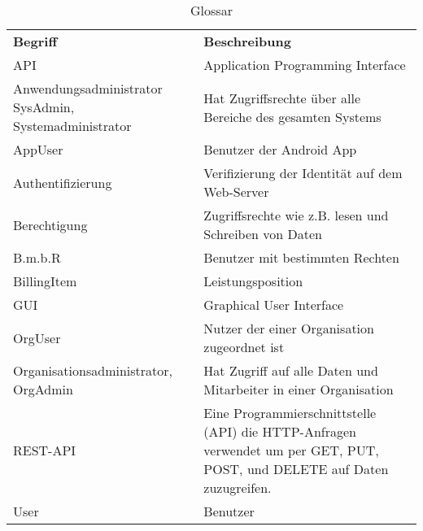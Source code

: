 
\begin{table}[h]
	\centering
	\begin{tabularx}{\textwidth}{X X}
		\rowcolor[HTML]{C0C0C0} 
		\textbf{Begriff} & \textbf{Beschreibung} \\
		API & Application Programming Interface\\

		\rowcolor[HTML]{E7E7E7} 
		Anwendungsadministrator SysAdmin, Systemadministrator  & Hat Zugriffsrechte über alle Bereiche des gesamten Systems \\
		AppUser & Benutzer der Android App \\

		\rowcolor[HTML]{E7E7E7} 		
		Authentifizierung & Verifizierung der Identität auf dem Web-Server \\
		Berechtigung & Zugriffsrechte wie z.B. lesen und Schreiben von Daten \\
		\rowcolor[HTML]{E7E7E7} 
		B.m.b.R & Benutzer mit bestimmten Rechten \\
		BillingItem & Leistungsposition \\
				\rowcolor[HTML]{E7E7E7} 
		GUI & Graphical User Interface \\



		OrgUser & Nutzer der einer Organisation zugeordnet ist \\
		\rowcolor[HTML]{E7E7E7} 
		Organisationsadministrator, OrgAdmin & Hat Zugriff auf alle Daten und Mitarbeiter in einer Organisation \\
		

		REST-API & Eine Programmierschnittstelle (API) die HTTP-Anfragen verwendet um per GET, PUT, POST, und DELETE auf Daten zuzugreifen.\\
		\rowcolor[HTML]{E7E7E7} 
		User & Benutzer \\
		
	

	\end{tabularx}
	\caption{Glossar}
	\label{table:glossar}
\end{table}